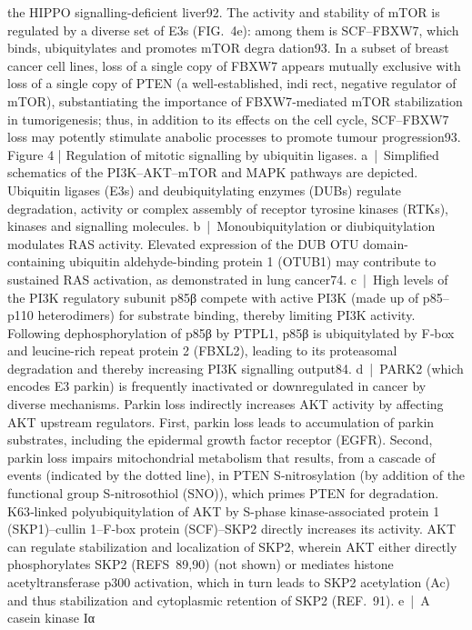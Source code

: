 the HIPPO signalling-deficient liver92.
The activity and stability of mTOR is regulated by a
diverse set of E3s (FIG. 4e): among them is SCF–FBXW7,
which binds, ubiquitylates and promotes mTOR degra­
dation93. In a subset of breast cancer cell lines, loss of a
single copy of FBXW7 appears mutually exclusive with
loss of a single copy of PTEN (a well-established, indi­
rect, negative regulator of mTOR), substantiating the
importance of FBXW7‑mediated mTOR stabilization in
tumorigenesis; thus, in addition to its effects on the cell
cycle, SCF–FBXW7 loss may potently stimulate anabolic
processes to promote tumour progression93.
Figure 4 | Regulation of mitotic signalling by ubiquitin ligases. a | Simplified
schematics of the PI3K–AKT–mTOR and MAPK pathways are depicted.  Ubiquitin ligases
(E3s) and deubiquitylating enzymes (DUBs) regulate degradation, activity or complex
assembly of receptor tyrosine kinases (RTKs), kinases and signalling molecules.
b | Monoubiquitylation or diubiquitylation modulates RAS activity. Elevated expression
of the DUB OTU domain-containing ubiquitin aldehyde-binding protein 1 (OTUB1) may
contribute to sustained RAS activation, as demonstrated in lung cancer74. c | High levels
of the PI3K regulatory subunit p85β compete with active PI3K (made up of p85–p110
heterodimers) for substrate binding, thereby limiting PI3K activity. Following
dephosphorylation of p85β by PTPL1, p85β is ubiquitylated by F‑box and leucine-rich
repeat protein 2 (FBXL2), leading to its proteasomal degradation and thereby increasing
PI3K signalling output84. d | PARK2 (which encodes E3 parkin) is frequently inactivated or
downregulated in cancer by diverse mechanisms. Parkin loss indirectly increases AKT
activity by affecting AKT upstream regulators. First, parkin loss leads to accumulation of
parkin substrates, including the epidermal growth factor receptor (EGFR). Second, parkin
loss impairs mitochondrial metabolism that results, from a cascade of events (indicated
by the dotted line), in PTEN S‑nitrosylation (by addition of the functional group
S‑nitrosothiol (SNO)), which primes PTEN for degradation. K63‑linked polyubiquitylation
of AKT by S-phase kinase-associated protein 1 (SKP1)–cullin 1–F‑box protein (SCF)–SKP2
directly increases its activity. AKT can regulate stabilization and localization of SKP2,
wherein AKT either directly phosphorylates SKP2 (REFS 89,90) (not shown) or mediates
histone acetyltransferase p300 activation, which in turn leads to SKP2 acetylation (Ac)
and thus stabilization and cytoplasmic retention of SKP2 (REF. 91). e | A casein kinase Iα
